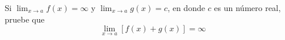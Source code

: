 \item Si $\lim_{x \to a} f(x) = \infty$ y $\lim_{x \to a} g(x) = c$, en donde $c$ es un número real, pruebe que 
    $$\lim_{x \to a} [f(x) + g(x)] = \infty$$
